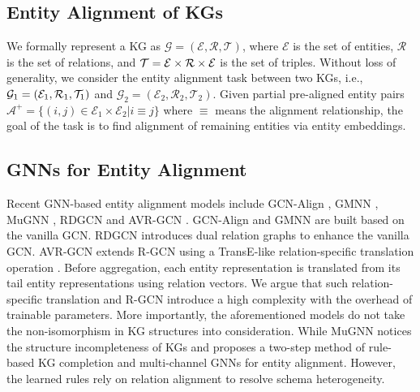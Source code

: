 \documentclass[letterpaper]{article} \usepackage{aaai20}  \usepackage{times}  \usepackage{helvet} \usepackage{courier}  \usepackage[hyphens]{url}  \usepackage{graphicx} \urlstyle{rm} \def\UrlFont{\rm}  \frenchspacing  \setlength{\pdfpagewidth}{8.5in}  \setlength{\pdfpageheight}{11in}  \usepackage{amsmath}
\begin{document}
\subsection{Entity Alignment of KGs}
We formally represent a KG as $\mathcal{G}=(\mathcal{E},\mathcal{R},\mathcal{T})$, where $\mathcal{E}$ is the set of entities, $\mathcal{R}$ is the set of relations, and $\mathcal{T}=\mathcal{E}\times\mathcal{R}\\\times\mathcal{E}$ is the set of triples. Without loss of generality, we consider the entity alignment task between two KGs, i.e., $\mathcal{G}_1=\\(\mathcal{E}_1,\mathcal{R}_1,\mathcal{T}_1)$ and $\mathcal{G}_2=(\mathcal{E}_2,\mathcal{R}_2,\mathcal{T}_2)$. Given partial pre-aligned entity pairs $\mathcal{A}^{+}=\{(i,j)\in\mathcal{E}_1 \times \mathcal{E}_2|i \equiv j\}$ where $\equiv$ means the alignment relationship, the goal of the task is to find alignment of remaining entities via entity embeddings. 

\subsection{GNNs for Entity Alignment}
Recent GNN-based entity alignment models include GCN-Align \cite{GCN_Align}, GMNN \cite{KGMatching}, MuGNN \cite{MuGNN}, RDGCN \cite{RDGCN} and AVR-GCN \cite{AVR-GCN}. GCN-Align and GMNN are built based on the vanilla GCN. RDGCN introduces dual relation graphs to enhance the vanilla GCN. AVR-GCN extends R-GCN using a TransE-like relation-specific translation operation \cite{TransE}. Before aggregation, each entity representation is translated from its tail entity representations using relation vectors. We argue that such relation-specific translation and R-GCN introduce a high complexity with the overhead of trainable parameters. More importantly, the aforementioned models do not take the non-isomorphism in KG structures into consideration. While MuGNN \cite{MuGNN} notices the structure incompleteness of KGs and proposes a two-step method of rule-based KG completion and multi-channel GNNs for entity alignment. However, the learned rules rely on relation alignment to resolve schema heterogeneity.
\end{document}
